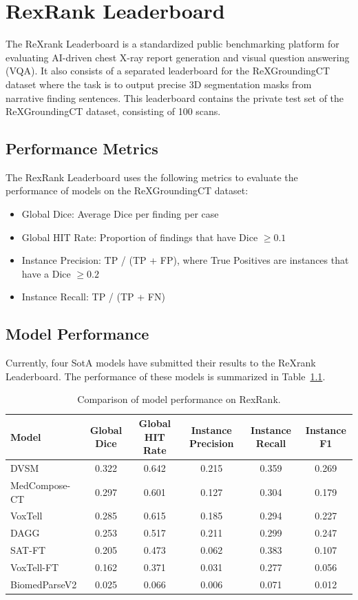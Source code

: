 \chapter{RexRank Leaderboard}\label{app:rexrank}

The ReXrank Leaderboard is a standardized public benchmarking platform for evaluating AI-driven chest X-ray report generation and
visual question answering (VQA). It also consists of a separated leaderboard for the ReXGroundingCT dataset where the task is to
output precise 3D segmentation masks from narrative finding sentences. This leaderboard contains the private test set of the
ReXGroundingCT dataset, consisting of 100 scans.

\section{Performance Metrics}
The RexRank Leaderboard uses the following metrics to evaluate the performance of models on the ReXGroundingCT dataset:
\begin{itemize}
    \item Global Dice: Average Dice per finding per case
    \item Global HIT Rate: Proportion of findings that have Dice $\ge 0.1$
    \item Instance Precision: TP / (TP + FP), where True Positives are instances that have a Dice $\ge 0.2$
    \item Instance Recall: TP / (TP + FN)
\end{itemize}

\section{Model Performance}

Currently, four SotA models have submitted their results to the ReXrank Leaderboard. The performance of these models
is summarized in Table~\ref{tab:rexrank-leaderboard}.

\begin{table}
\centering
\caption{Comparison of model performance on RexRank.}
\label{tab:rexrank-leaderboard}
\begin{tabular}{lccccc}
\toprule
\textbf{Model} &
\textbf{Global Dice} &
\textbf{Global HIT Rate} &
\textbf{Instance Precision} &
\textbf{Instance Recall} &
\textbf{Instance F1} \\
\midrule
DVSM          & 0.322 & 0.642 & 0.215 & 0.359 & 0.269 \\
MedCompose-CT & 0.297 & 0.601 & 0.127 & 0.304 & 0.179 \\
VoxTell       & 0.285 & 0.615 & 0.185 & 0.294 & 0.227 \\
DAGG          & 0.253 & 0.517 & 0.211 & 0.299 & 0.247 \\
SAT-FT        & 0.205 & 0.473 & 0.062 & 0.383 & 0.107 \\
VoxTell-FT    & 0.162 & 0.371 & 0.031 & 0.277 & 0.056 \\
BiomedParseV2 & 0.025 & 0.066 & 0.006 & 0.071 & 0.012 \\
\bottomrule
\end{tabular}
\end{table}

